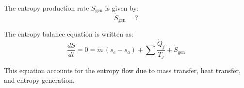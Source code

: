 The entropy production rate \( \dot{S}_{\text{gen}} \) is given by:  
\[
\dot{S}_{\text{gen}} = ?
\]  

The entropy balance equation is written as:  
\[
\frac{dS}{dt} = 0 = \dot{m} \, (s_e - s_a) + \sum \frac{\dot{Q}_j}{T_j} + \dot{S}_{\text{gen}}
\]  

This equation accounts for the entropy flow due to mass transfer, heat transfer, and entropy generation.